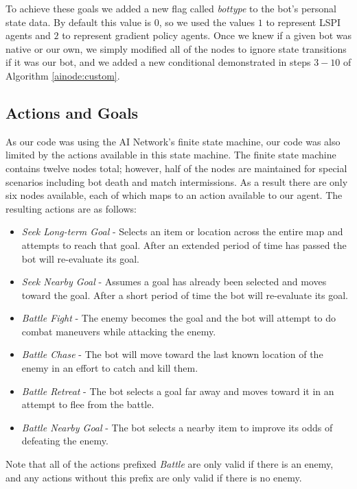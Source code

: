 To achieve these goals we added a new flag called \emph{bottype} to the bot's personal state data. By default this value is $0$, so we used the values $1$ to represent LSPI agents and $2$ to represent gradient policy agents. Once we knew if a given bot was native or our own, we simply modified all of the nodes to ignore state transitions if it was our bot, and we added a new conditional demonstrated in steps $3-10$ of Algorithm \ref{ainode:custom}.

\subsection{Actions and Goals}

As our code was using the AI Network's finite state machine, our code was also limited by the actions available in this state machine. The finite state machine contains twelve nodes total; however, half of the nodes are maintained for special scenarios including bot death and match intermissions. As a result there are only six nodes available, each of which maps to an action available to our agent. The resulting actions are as follows:

\begin{itemize}
    \item \emph{Seek Long-term Goal} - Selects an item or location across the entire map and attempts to reach that goal. After an extended period of time has passed the bot will re-evaluate its goal.
    \item \emph{Seek Nearby Goal} - Assumes a goal has already been selected and moves toward the goal. After a short period of time the bot will re-evaluate its goal.
    \item \emph{Battle Fight} - The enemy becomes the goal and the bot will attempt to do combat maneuvers while attacking the enemy.
    \item \emph{Battle Chase} - The bot will move toward the last known location of the enemy in an effort to catch and kill them.
    \item \emph{Battle Retreat} - The bot selects a goal far away and moves toward it in an attempt to flee from the battle.
    \item \emph{Battle Nearby Goal} - The bot selects a nearby item to improve its odds of defeating the enemy.
\end{itemize}
Note that all of the actions prefixed \emph{Battle} are only valid if there is an enemy, and any actions without this prefix are only valid if there is no enemy.


